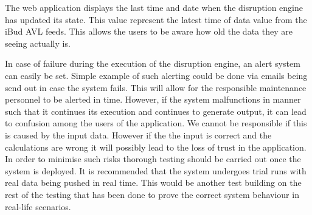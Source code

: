 The web application displays the last time and date when the disruption engine has updated its state. This value represent the latest time of data value from the iBud AVL feeds. This allows the users to be aware how old the data they are seeing actually is.

In case of failure during the execution of the disruption engine, an alert system can easily be set. Simple example of such alerting could be done via emails being send out in case the system fails. This will allow for the responsible maintenance personnel to be alerted in time. However, if the system malfunctions in manner such that it continues its execution and continues to generate output, it can lead to confusion among the users of the application. We cannot be responsible if this is caused by the input data. However if the the input is correct and the calculations are wrong it will possibly lead to the loss of trust in the application. In order to minimise such risks thorough testing should be carried out once the system is deployed. It is recommended that the system undergoes trial runs with real data being pushed in real time. This would be another test building on the rest of the testing that has been done to prove the correct system behaviour in real-life scenarios.




